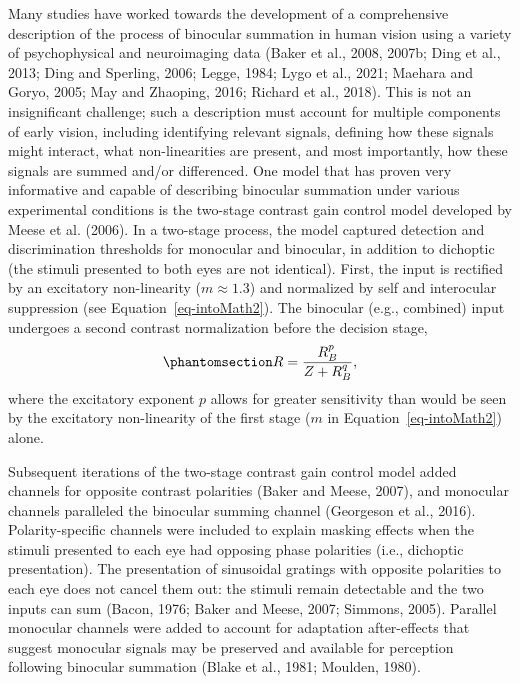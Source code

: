 \documentclass[
  12pt,
]{article}
\begin{document}
Many studies have worked towards the development of a comprehensive
description of the process of binocular summation in human vision using
a variety of psychophysical and neuroimaging data (Baker et al., 2008,
2007b; Ding et al., 2013; Ding and Sperling, 2006; Legge, 1984; Lygo et
al., 2021; Maehara and Goryo, 2005; May and Zhaoping, 2016; Richard et
al., 2018). This is not an insignificant challenge; such a description
must account for multiple components of early vision, including
identifying relevant signals, defining how these signals might interact,
what non-linearities are present, and most importantly, how these
signals are summed and/or differenced. One model that has proven very
informative and capable of describing binocular summation under various
experimental conditions is the two-stage contrast gain control model
developed by Meese et al. (2006). In a two-stage process, the model
captured detection and discrimination thresholds for monocular and
binocular, in addition to dichoptic (the stimuli presented to both eyes
are not identical). First, the input is rectified by an excitatory
non-linearity (\(m \approx 1.3\)) and normalized by self and interocular
suppression (see Equation~\ref{eq-intoMath2}). The binocular (e.g.,
combined) input undergoes a second contrast normalization before the
decision stage,
\begin{equation}\phantomsection\label{eq-IntroMathSecondStage}{
R = \frac{R_B^p}{Z + R_B^q},
}\end{equation} where the excitatory exponent \(p\) allows for greater
sensitivity than would be seen by the excitatory non-linearity of the
first stage (\(m\) in Equation~\ref{eq-intoMath2}) alone.

Subsequent iterations of the two-stage contrast gain control model added
channels for opposite contrast polarities (Baker and Meese, 2007), and
monocular channels paralleled the binocular summing channel (Georgeson
et al., 2016). Polarity-specific channels were included to explain
masking effects when the stimuli presented to each eye had opposing
phase polarities (i.e., dichoptic presentation). The presentation of
sinusoidal gratings with opposite polarities to each eye does not cancel
them out: the stimuli remain detectable and the two inputs can sum
(Bacon, 1976; Baker and Meese, 2007; Simmons, 2005). Parallel monocular
channels were added to account for adaptation after-effects that suggest
monocular signals may be preserved and available for perception
following binocular summation (Blake et al., 1981; Moulden, 1980).
\end{document}
